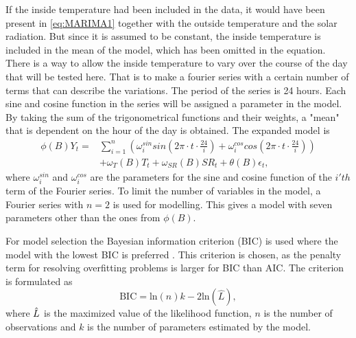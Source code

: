 \noindent If the inside temperature had been included in the data, it would have been present in \cref{eq:MARIMA1} together with the outside temperature and the solar radiation. But since it is assumed to be constant, the inside temperature is included in the mean of the model, which has been omitted in the equation. There is a way to allow the inside temperature to vary over the course of the day that will be tested here. That is to make a fourier series with a certain number of terms that can describe the variations. The period of the series is 24 hours. Each sine and cosine function in the series will be assigned a parameter in the model. By taking the sum of the trigonometrical functions and their weights, a "mean" that is dependent on the hour of the day is obtained. The expanded model is
\begin{align}
    \phi (B) Y_t = &\sum_{i=1}^n \left(\omega^{sin}_i sin\left(2\pi\cdot t \cdot \frac{24}{i}\right) + \omega^{cos}_i cos\left(2\pi\cdot t \cdot \frac{24}{i}\right)\right) \nonumber\\ & + \omega_{T}(B)T_t + \omega_{SR}(B)SR_t + \theta (B) \epsilon_t ,
    \label{eq:MARIMA2}
\end{align}
where $\omega^{sin}_i$ and $\omega^{cos}_i$ are the parameters for the sine and cosine function of the $i'th$ term of the Fourier series. To limit the number of variables in the model, a Fourier series with $n=2$ is used for modelling. This gives a model with seven parameters other than the ones from $\phi(B)$.



\noindent For model selection the Bayesian information criterion (BIC) is used where the model with the lowest BIC is preferred \cite{BIC}. This criterion is chosen, as the penalty term for resolving overfitting problems is larger for BIC than AIC. The criterion is formulated as
\begin{equation}
    \text{BIC} = \text{ln}(n)k - 2\text{ln}(\widehat{L}),
\end{equation}
where $\Hat{L}$ is the maximized value of the likelihood function, $n$ is the number of observations and $k$ is the number of parameters estimated by the model. \\

